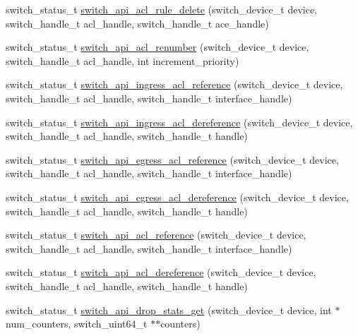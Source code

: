 \begin{DoxyCompactItemize}
switch\+\_\+status\+\_\+t \hyperlink{group__ACL_ga165c72a874e4dc0cb6782f8257362d35}{switch\+\_\+api\+\_\+acl\+\_\+rule\+\_\+delete} (switch\+\_\+device\+\_\+t device, switch\+\_\+handle\+\_\+t acl\+\_\+handle, switch\+\_\+handle\+\_\+t ace\+\_\+handle)
\item 
switch\+\_\+status\+\_\+t \hyperlink{group__ACL_ga9c4e143507a9d432c00e3eacee51bda9}{switch\+\_\+api\+\_\+acl\+\_\+renumber} (switch\+\_\+device\+\_\+t device, switch\+\_\+handle\+\_\+t acl\+\_\+handle, int increment\+\_\+priority)
\item 
switch\+\_\+status\+\_\+t \hyperlink{group__ACL_gadffa38beb98075a4b2c84a157a7dfbbb}{switch\+\_\+api\+\_\+ingress\+\_\+acl\+\_\+reference} (switch\+\_\+device\+\_\+t device, switch\+\_\+handle\+\_\+t acl\+\_\+handle, switch\+\_\+handle\+\_\+t interface\+\_\+handle)
\item 
switch\+\_\+status\+\_\+t \hyperlink{group__ACL_gae5a76abc50f193aa9f063bacbec92c41}{switch\+\_\+api\+\_\+ingress\+\_\+acl\+\_\+dereference} (switch\+\_\+device\+\_\+t device, switch\+\_\+handle\+\_\+t acl\+\_\+handle, switch\+\_\+handle\+\_\+t handle)
\item 
switch\+\_\+status\+\_\+t \hyperlink{group__ACL_ga579816429084576d4a506b44cc1eebfc}{switch\+\_\+api\+\_\+egress\+\_\+acl\+\_\+reference} (switch\+\_\+device\+\_\+t device, switch\+\_\+handle\+\_\+t acl\+\_\+handle, switch\+\_\+handle\+\_\+t interface\+\_\+handle)
\item 
switch\+\_\+status\+\_\+t \hyperlink{group__ACL_ga3c57fb7715c9369027d0df0b4111117f}{switch\+\_\+api\+\_\+egress\+\_\+acl\+\_\+dereference} (switch\+\_\+device\+\_\+t device, switch\+\_\+handle\+\_\+t acl\+\_\+handle, switch\+\_\+handle\+\_\+t handle)
\item 
switch\+\_\+status\+\_\+t \hyperlink{group__ACL_ga711d54c46489c9eb18fe74f03ef58642}{switch\+\_\+api\+\_\+acl\+\_\+reference} (switch\+\_\+device\+\_\+t device, switch\+\_\+handle\+\_\+t acl\+\_\+handle, switch\+\_\+handle\+\_\+t interface\+\_\+handle)
\item 
switch\+\_\+status\+\_\+t \hyperlink{group__ACL_gac271cf6987b54bde6176e62a70a82e54}{switch\+\_\+api\+\_\+acl\+\_\+dereference} (switch\+\_\+device\+\_\+t device, switch\+\_\+handle\+\_\+t acl\+\_\+handle, switch\+\_\+handle\+\_\+t handle)
\item 
switch\+\_\+status\+\_\+t \hyperlink{group__ACL_gab708da756b60b2c1c983b46a6de08b69}{switch\+\_\+api\+\_\+drop\+\_\+stats\+\_\+get} (switch\+\_\+device\+\_\+t device, int $\ast$num\+\_\+counters, switch\+\_\+uint64\+\_\+t $\ast$$\ast$counters)
$$
\end{DoxyCompactItemize}

